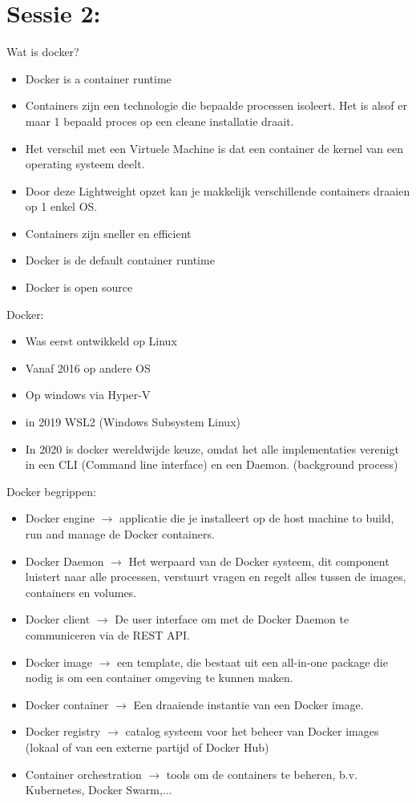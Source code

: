 \documentclass[12pt]{article}
\begin{document}
\section{Sessie 2:}
Wat is docker?\begin{itemize}
    \item Docker is a container runtime 
    \item Containers zijn een technologie die bepaalde processen isoleert. Het is alsof er maar 1 bepaald proces op een cleane installatie draait.
    \item Het verschil met een Virtuele Machine is dat een container de kernel van een operating systeem deelt.
    \item Door deze Lightweight opzet kan je makkelijk verschillende containers draaien op 1 enkel OS.
    \item Containers zijn sneller en efficient 
    \item Docker is de default container runtime 
    \item Docker is open source
\end{itemize}
Docker:
\begin{itemize}
    \item Was eerst ontwikkeld op Linux 
    \item Vanaf 2016 op andere OS 
    \item Op windows via Hyper-V 
    \item in 2019 WSL2 (Windows Subsystem Linux)
    \item In 2020 is docker wereldwijde keuze, omdat het alle implementaties verenigt in een CLI (Command line interface) en een Daemon. (background process)
\end{itemize}
Docker begrippen:\begin{itemize}
    \item Docker engine $\rightarrow$ applicatie die je installeert op de host machine to build, run and manage de Docker containers.
    \item Docker Daemon $\rightarrow$ Het werpaard van de Docker systeem, dit component luistert naar alle processen, verstuurt vragen en regelt alles tussen de images, containers en volumes.
    \item Docker client $\rightarrow$ De user interface om met de Docker Daemon te communiceren via de REST API.
    \item Docker image $\rightarrow$ een template, die bestaat uit een all-in-one package die nodig is om een container omgeving te kunnen maken.
    \item Docker container $\rightarrow$ Een draaiende instantie van een Docker image.
    \item Docker registry $\rightarrow$ catalog systeem voor het beheer van Docker images (lokaal of van een externe partijd of Docker Hub)
    \item Container orchestration $\rightarrow$ tools om de containers te beheren, b.v. Kubernetes, Docker Swarm,... 
\end{itemize}
\end{document}
